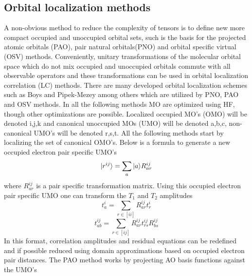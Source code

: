 	\subsection{Orbital localization methods}
		A non-obvious method to reduce the complexity of tensors is to define new more compact occupied and unoccupied orbital sets, such is the basis for the projected atomic orbitals (PAO), pair natural orbitals(PNO) and orbital specific virtual (OSV) methods. Conveniently, unitary transformations of the molecular orbital space which do not mix occupied and unoccupied orbitals commute with all observable operators\cite{SzaboAttila1982} and these transformations can be used in orbital localization correlation (LC) methods. There are many developed orbital localization schemes such as Boys and Pipek-Mezey\cite{Boughton1993} among others which are utilized by PNO, PAO and OSV methods. In all the following methods MO are optimized using HF, though other optimizations are possible. Localized occupied MO's (OMO) will be denoted i,j,k and canonical unoccupied MOs (UMO) will be denoted a,b,c, non-canonical UMO's will be denoted r,s,t. All the following methods start by localizing the set of canonical OMO's. Below is a formula to generate a new occupied electron pair specific UMO's 
			\begin{equation}
				| r^{ij} \rangle = \sum_a | a \rangle R^{ij}_{ar}
			\end{equation}
		where $R^{ij}_{ar}$ is a pair specific transformation matrix. Using this occupied electron pair specific UMO one can transform the $T_1$ and $T_2$ amplitudes%
			\begin{equation}
				t^i_a = \sum_{r\in[ii]} R^{ij}_{ar}t^i_r
			\end{equation}
			\begin{equation}
			t^{ij}_{ab} = \sum_{r\in[ij]} R^{ij}_{ar}t^{ij}_{rs}R^{ij}_{bs}
			\end{equation}
		In this format, correlation amplitudes and residual equations can be redefined and if possible reduced using domain approximations based on occupied electron pair distances\cite{Yang2012}.
		The PAO method works by projecting AO basis functions against the UMO's\cite{Pulay1983}
